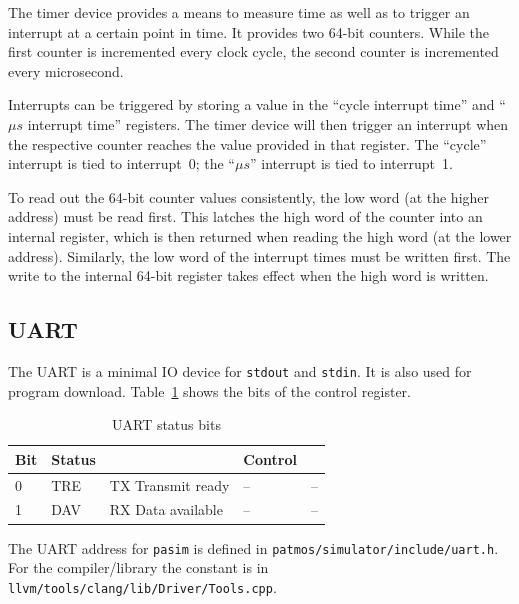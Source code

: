 \documentclass[a4paper,fontsize=10pt,twoside,DIV15,BCOR12mm,headinclude=true,footinclude=false,pagesize,bibtotoc]{scrbook}
\newcommand{\code}[1]{{\texttt{#1}}}
\begin{document}
The timer device provides a means to measure time as well as to
trigger an interrupt at a certain point in time. It provides two
64-bit counters. While the first counter is incremented every clock
cycle, the second counter is incremented every microsecond.

Interrupts can be triggered by storing a value in the ``cycle
interrupt time'' and ``$\mu s$ interrupt time'' registers. The timer
device will then trigger an interrupt when the respective counter
reaches the value provided in that register. The ``cycle'' interrupt
is tied to interrupt~0; the ``$\mu s$'' interrupt is tied to
interrupt~1.

To read out the 64-bit counter values consistently, the low word (at
the higher address) must be read first. This latches the high word of
the counter into an internal register, which is then returned when
reading the high word (at the lower address). Similarly, the low word
of the interrupt times must be written first. The write to the
internal 64-bit register takes effect when the high word is written.

\subsection{UART}

The UART is a minimal IO device for \texttt{stdout} and \texttt{stdin}.
It is also used for program download. Table~\ref{tab:uart} shows the
bits of the control register.

\begin{table}
\centering
\begin{tabular}{lllll}
\toprule
Bit & Status & & Control & \\
\midrule
0 & TRE & TX Transmit ready & -- & -- \\
1 & DAV & RX Data available & -- & -- \\
\bottomrule
\end{tabular}
\caption{UART status bits} %
\label{tab:uart}
\end{table}

The UART address for \code{pasim} is defined in \code{patmos/simulator/include/uart.h}.
For the compiler/library the constant is in \code{llvm/tools/clang/lib/Driver/Tools.cpp}.
\end{document}
